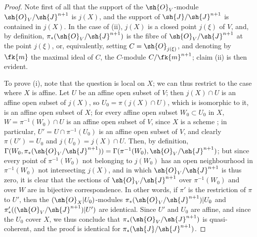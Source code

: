 \begin{proof}
\label{proof-II.8.10.1}
Note first of all that the support of the $\sh{O}_V$-module $\sh{O}_V/\sh{J}^{n+1}$ is $j(X)$, and the support of $\sh{J}/\sh{J}^{n+1}$ is contained in $j(X)$.
In the case of (ii), $j(X)$ is a closed point $j(\xi)$ of $V$,
and, by definition, $\pi_*(\sh{O}_V/\sh{J}^{n+1})$ is the fibre of $\sh{O}_V/\sh{J}^{n+1}$ at the point $j(\xi)$, or, equivalently, setting $C=\sh{O}_{j(\xi)}$, and denoting by $\fk{m}$ the maximal ideal of $C$, the $C$-module $C/\fk{m}^{n+1}$;
claim (ii) is then evident.

To prove (i), note that the question is local on $X$;
we can thus restrict to the case where $X$ is affine.
Let $U$ be an affine open subset of $V$;
then $j(X)\cap U$ is an affine open subset of $j(X)$, so $U_0=\pi(j(X)\cap U)$, which is isomorphic to it, is an affine open subset of $X$;
for every affine open subset $W_0\subset U_0$ in $X$, $W=\pi^{-1}(W_0)\cap U$ is an affine open subset of $V$, since $X$ is a scheme ;
in particular, $U'=U\cap\pi^{-1}(U_0)$ is an affine open subset of $V$, and clearly $\pi(U')=U_0$ and $j(U_0)=j(X)\cap U$.
Then, by definition, $\Gamma(W_0,\pi_*(\sh{O}_V/\sh{J}^{n+1})) = \Gamma(\pi^{-1}(W_0),\sh{O}_V/\sh{J}^{n+1})$;
but since every point of $\pi^{-1}(W_0)$ not belonging to $j(W_0)$ has an open neighbourhood in $\pi^{-1}(W_0)$ not intersecting $j(X)$, and in which $\sh{O}_V/\sh{J}^{n+1}$ is thus zero, it is clear that the sections of $\sh{O}_V/\sh{J}^{n+1}$ over $\pi^{-1}(W_0)$ and over $W$ are in bijective correspondence.
In other words, if $\pi'$ is the restriction of $\pi$ to $U'$, then the $(\sh{O}_X|U_0)$-modules $\pi_*(\sh{O}_V/\sh{J}^{n+1})|U_0$ and $\pi'_*((\sh{O}_V/\sh{J}^{n+1})|U')$ are identical.
Since $U'$ and $U_0$ are affine, and since the $U_0$ cover $X$, we thus conclude  that $\pi_*(\sh{O}_V/\sh{J}^{n+1})$ is quasi-coherent, and the proof is identical for $\pi_*(\sh{J}/\sh{J}^{n+1})$.


\end{proof}
